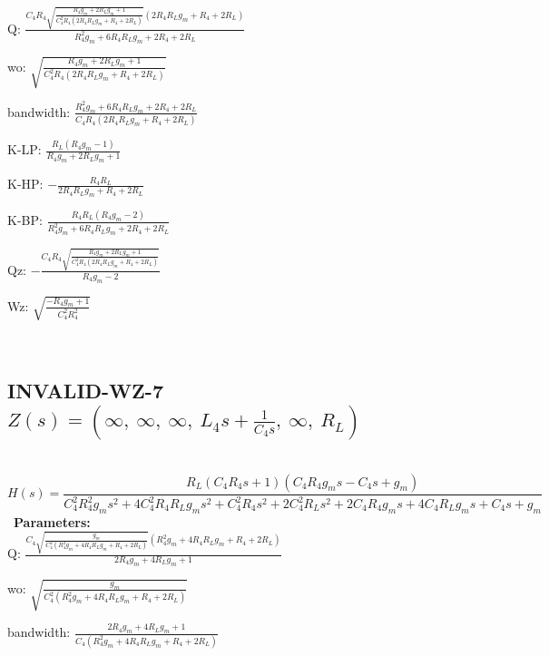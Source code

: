\documentclass{article}
\begin{document}
Q: $\frac{C_{4} R_{4} \sqrt{\frac{R_{4} g_{m} + 2 R_{L} g_{m} + 1}{C_{4}^{2} R_{4} \left(2 R_{4} R_{L} g_{m} + R_{4} + 2 R_{L}\right)}} \left(2 R_{4} R_{L} g_{m} + R_{4} + 2 R_{L}\right)}{R_{4}^{2} g_{m} + 6 R_{4} R_{L} g_{m} + 2 R_{4} + 2 R_{L}}$\ 

wo: $\sqrt{\frac{R_{4} g_{m} + 2 R_{L} g_{m} + 1}{C_{4}^{2} R_{4} \left(2 R_{4} R_{L} g_{m} + R_{4} + 2 R_{L}\right)}}$\ 

bandwidth: $\frac{R_{4}^{2} g_{m} + 6 R_{4} R_{L} g_{m} + 2 R_{4} + 2 R_{L}}{C_{4} R_{4} \left(2 R_{4} R_{L} g_{m} + R_{4} + 2 R_{L}\right)}$\ 

K-LP: $\frac{R_{L} \left(R_{4} g_{m} - 1\right)}{R_{4} g_{m} + 2 R_{L} g_{m} + 1}$\ 

K-HP: $- \frac{R_{4} R_{L}}{2 R_{4} R_{L} g_{m} + R_{4} + 2 R_{L}}$\ 

K-BP: $\frac{R_{4} R_{L} \left(R_{4} g_{m} - 2\right)}{R_{4}^{2} g_{m} + 6 R_{4} R_{L} g_{m} + 2 R_{4} + 2 R_{L}}$\ 

Qz: $- \frac{C_{4} R_{4} \sqrt{\frac{R_{4} g_{m} + 2 R_{L} g_{m} + 1}{C_{4}^{2} R_{4} \left(2 R_{4} R_{L} g_{m} + R_{4} + 2 R_{L}\right)}}}{R_{4} g_{m} - 2}$\ 

Wz: $\sqrt{\frac{- R_{4} g_{m} + 1}{C_{4}^{2} R_{4}^{2}}}$\ 

\ 

\subsection{INVALID-WZ-7 $Z(s) = \left( \infty, \  \infty, \  \infty, \  L_{4} s + \frac{1}{C_{4} s}, \  \infty, \  R_{L}\right)$ } \ 
\textbf{\[H(s) = \frac{R_{L} \left(C_{4} R_{4} s + 1\right) \left(C_{4} R_{4} g_{m} s - C_{4} s + g_{m}\right)}{C_{4}^{2} R_{4}^{2} g_{m} s^{2} + 4 C_{4}^{2} R_{4} R_{L} g_{m} s^{2} + C_{4}^{2} R_{4} s^{2} + 2 C_{4}^{2} R_{L} s^{2} + 2 C_{4} R_{4} g_{m} s + 4 C_{4} R_{L} g_{m} s + C_{4} s + g_{m}}\] } \ 
\textbf{Parameters:}\\ 

Q: $\frac{C_{4} \sqrt{\frac{g_{m}}{C_{4}^{2} \left(R_{4}^{2} g_{m} + 4 R_{4} R_{L} g_{m} + R_{4} + 2 R_{L}\right)}} \left(R_{4}^{2} g_{m} + 4 R_{4} R_{L} g_{m} + R_{4} + 2 R_{L}\right)}{2 R_{4} g_{m} + 4 R_{L} g_{m} + 1}$\ 

wo: $\sqrt{\frac{g_{m}}{C_{4}^{2} \left(R_{4}^{2} g_{m} + 4 R_{4} R_{L} g_{m} + R_{4} + 2 R_{L}\right)}}$\ 

bandwidth: $\frac{2 R_{4} g_{m} + 4 R_{L} g_{m} + 1}{C_{4} \left(R_{4}^{2} g_{m} + 4 R_{4} R_{L} g_{m} + R_{4} + 2 R_{L}\right)}$\ 
\end{document}

